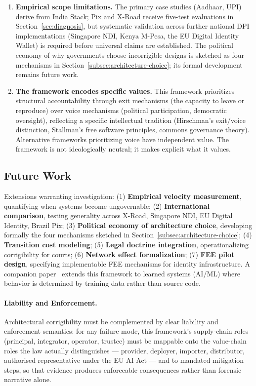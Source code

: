 \documentclass{article}
\begin{document}
\begin{enumerate}
    \item \textbf{Empirical scope limitations.} The primary case studies (Aadhaar, UPI) derive from India Stack; Pix and X-Road receive five-test evaluations in Section~\ref{sec:diagnosis}, but systematic validation across further national DPI implementations (Singapore NDI, Kenya M-Pesa, the EU Digital Identity Wallet) is required before universal claims are established. The political economy of why governments choose incorrigible designs is sketched as four mechanisms in Section~\ref{subsec:architecture-choice}; its formal development remains future work.

    \item \textbf{The framework encodes specific values.} This framework prioritizes structural accountability through exit mechanisms (the capacity to leave or reproduce) over voice mechanisms (political participation, democratic oversight), reflecting a specific intellectual tradition (Hirschman's exit/voice distinction, Stallman's free software principles, commons governance theory). Alternative frameworks prioritizing voice have independent value. The framework is not ideologically neutral; it makes explicit what it values.
\end{enumerate}

\subsection{Future Work}

Extensions warranting investigation: (1) \textbf{Empirical velocity measurement}, quantifying when systems become ungovernable; (2) \textbf{International comparison}, testing generality across X-Road, Singapore NDI, EU Digital Identity, Brazil Pix; (3) \textbf{Political economy of architecture choice}, developing formally the four mechanisms sketched in Section~\ref{subsec:architecture-choice}; (4) \textbf{Transition cost modeling}; (5) \textbf{Legal doctrine integration}, operationalizing corrigibility for courts; (6) \textbf{Network effect formalization}; (7) \textbf{FEE pilot design}, specifying implementable FEE mechanisms for identity infrastructure. A companion paper~\citep{aravind2026epi} extends this framework to learned systems (AI/ML) where behavior is determined by training data rather than source code.

\paragraph{Liability and Enforcement.} Architectural corrigibility must be complemented by clear liability and enforcement semantics: for any failure mode, this framework's supply-chain roles (principal, integrator, operator, trustee) must be mappable onto the value-chain roles the law actually distinguishes --- provider, deployer, importer, distributor, authorised representative under the EU AI Act \citep{euaiact2024} --- and to mandated mitigation steps, so that evidence produces enforceable consequences rather than forensic narrative alone.
\end{document}
